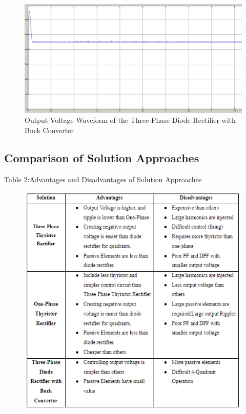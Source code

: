 \documentclass{article}
\begin{document}
\begin{figure}[h!]
\centering
\includegraphics[scale=0.25]{furkanvoltage}
\caption{Output Voltage Waveform of the Three-Phase Diode Rectifier with Buck Converter}
\label{fig:members}
\end{figure}

\newpage
\subsection{Comparison of Solution Approaches} %

\noindent Table 2:Advantages and Disadvantages of Solution Approaches
\begin{figure}[h!]
\centering
\includegraphics[scale=0.8]{comporison}
\label{fig:members}
\end{figure}
\end{document}
